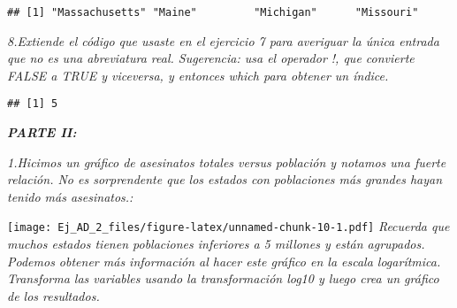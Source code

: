 \documentclass[
]{article}
\newenvironment{Shaded}{\begin{snugshade}}{\end{snugshade}}
\newcommand{\DecValTok}[1]{\textcolor[rgb]{0.00,0.00,0.81}{#1}}
\newcommand{\FunctionTok}[1]{\textcolor[rgb]{0.00,0.00,0.00}{#1}}
\newcommand{\NormalTok}[1]{#1}
\newcommand{\OtherTok}[1]{\textcolor[rgb]{0.56,0.35,0.01}{#1}}
\newcommand{\SpecialCharTok}[1]{\textcolor[rgb]{0.00,0.00,0.00}{#1}}
\newcommand{\StringTok}[1]{\textcolor[rgb]{0.31,0.60,0.02}{#1}}
\begin{document}
\begin{verbatim}
## [1] "Massachusetts" "Maine"         "Michigan"      "Missouri"
\end{verbatim}

\emph{8.Extiende el código que usaste en el ejercicio 7 para averiguar
la única entrada que no es una abreviatura real. Sugerencia: usa el
operador !, que convierte FALSE a TRUE y viceversa, y entonces which
para obtener un índice.}

\begin{Shaded}
\end{Shaded}

\begin{verbatim}
## [1] 5
\end{verbatim}

\textbf{\emph{PARTE II:}}

\emph{1.Hicimos un gráfico de asesinatos totales versus población y
notamos una fuerte relación. No es sorprendente que los estados con
poblaciones más grandes hayan tenido más asesinatos.:}

\begin{Shaded}
\end{Shaded}

\texttt{[image: Ej\_AD\_2\_files/figure-latex/unnamed-chunk-10-1.pdf]}
\emph{Recuerda que muchos estados tienen poblaciones inferiores a 5
millones y están agrupados. Podemos obtener más información al hacer
este gráfico en la escala logarítmica. Transforma las variables usando
la transformación log10 y luego crea un gráfico de los resultados.}
\end{document}
